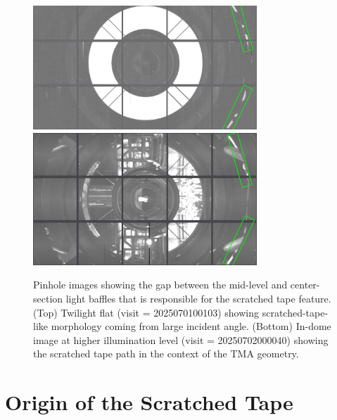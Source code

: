 \documentclass[SE,authoryear,toc]{lsstdoc}
\begin{document}
\begin{figure}[t!]
    \centering
    \includegraphics[width=0.75\textwidth]{figures/quicklook_2025070100103.png}\\[+0.5em]
    \includegraphics[width=0.75\textwidth]{figures/quicklook_2025070200040.png}  \caption{\label{fig:pinhole} Pinhole images showing the gap between the mid-level and center-section light baffles that is responsible for the scratched tape feature. (Top) Twilight flat (visit = 2025070100103) showing scratched-tape-like morphology coming from large incident angle. (Bottom) In-dome image at higher illumination level (visit = 20250702000040) showing the scratched tape path in the context of the TMA geometry.}
\end{figure}

\section{Origin of the Scratched Tape}
\label{sec:cause}
\end{document}
